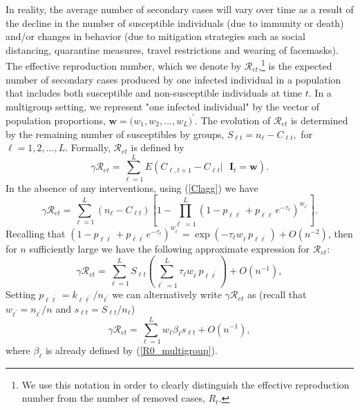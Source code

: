 \documentclass[12pt]{article}
\begin{document}
In reality, the average number of secondary cases will vary over time as a
result of the decline in the number of susceptible individuals (due to
immunity or death) and/or changes in behavior (due to mitigation strategies
such as social distancing, quarantine measures, travel restrictions and
wearing of facemasks). The effective reproduction number, which we denote by
$\mathcal{R}_{et}$,\footnote{We use this notation in order to clearly
distinguish the effective reproduction number from the number of removed
cases, $R_{t}$.} is the expected number of secondary cases produced by one
infected individual in a population that includes both susceptible and
non-susceptible individuals at time $t.$ In a multigroup setting, we represent
"one infected individual" by the vector of population proportions,
$\mathbf{w=(}w_{1},w_{2},\ldots,w_{L})^{\prime}$. The evolution of
$\mathcal{R}_{et}$ is determined by the remaining number of susceptibles by
groups, $S_{\ell t}=n_{\ell}-C_{\ell t},$ for $\ell=1,2,\ldots,L$. Formally,
$\mathcal{R}_{et}$ is defined by
\begin{equation}
\gamma\mathcal{R}_{et}=\sum_{\ell=1}^{L}E\left(  C_{\ell,t+1}-C_{\ell
t}|\text{ }\mathbf{I}_{t}=\mathbf{w}\right)  .\label{Ret_def}%
\end{equation}
In the absence of any interventions, using (\ref{Clagg}) we have
\begin{equation}
\gamma\mathcal{R}_{et}=\sum_{\ell=1}^{L}\left(  n_{\ell}-C_{\ell t}\right)
\left[  1-\prod_{\ell^{^{\prime}}=1}^{L}\left(  1-p_{\ell\ell^{^{\prime}}%
}+p_{\ell\ell^{^{\prime}}}e^{-\tau_{\ell}}\right)  ^{w_{\ell^{\prime}}%
}\right]  .\label{RetExat}%
\end{equation}
Recalling that $\left(  1-p_{\ell\ell^{^{\prime}}}+p_{\ell\ell^{^{\prime}}%
}e^{-\tau_{\ell}}\right)  ^{w_{\ell^{^{\prime}}}}=\exp\left(  -\tau_{\ell
}w_{\ell^{^{\prime}}}p_{\ell\ell^{^{\prime}}}\right)  +O\left(  n^{-2}\right)
$, then for $n$ sufficiently large we have the following approximate
expression for $\mathcal{R}_{et}$:
\[
\gamma\mathcal{R}_{et}=\sum_{\ell=1}^{L}S_{\ell t}\left(  \sum_{\ell^{\prime
}=1}^{L}\tau_{\ell}w_{\ell^{^{\prime}}}p_{\ell\ell^{^{\prime}}}\right)
+O\left(  n^{-1}\right)  ,
\]
Setting $p_{\ell\ell^{^{\prime}}}=k_{\ell\ell^{\prime}}/n_{\ell^{\prime}}$ we
can alternatively write $\gamma\mathcal{R}_{et}$ as (recall that
$w_{\ell^{\prime}}=n_{\ell^{\prime}}/n$ and $s_{\ell t}=S_{\ell t}/n_{\ell}$)
\begin{equation}
\gamma\mathcal{R}_{et}=\sum_{\ell=1}^{L}w_{\ell}\beta_{\ell}s_{\ell
t}+O\left(  n^{-1}\right)  ,\label{Ret}%
\end{equation}
where $\beta_{\ell}$ is already defined by (\ref{R0_multigroup}).
\end{document}
